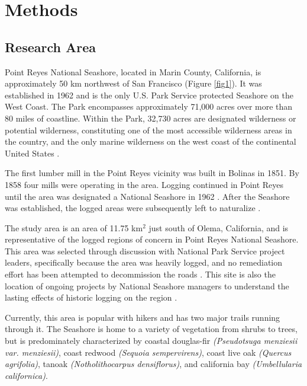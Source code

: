 \documentclass[remotesensing,article,submit,pdftex,moreauthors]{Definitions/mdpi}
\begin{document}
\section{Methods}
\subsection{Research Area}

Point Reyes National Seashore, located in Marin County, California, is approximately 50 km northwest of San Francisco (Figure \ref{fig1}). It was established in 1962 and is the only U.S. Park Service protected Seashore on the West Coast. The Park encompasses approximately 71,000 acres over more than 80 miles of coastline. Within the Park, 32,730 acres are designated wilderness or potential wilderness, constituting one of the most accessible wilderness areas in the country, and the only marine wilderness on the west coast of the continental United States \cite{council}.  

The first lumber mill in the Point Reyes vicinity was built in Bolinas in 1851. By 1858 four mills were operating in the area. Logging continued in Point Reyes until the area was designated a National Seashore in 1962 \cite{livingston}. After the Seashore was established, the logged areas were subsequently left to naturalize \cite{becker}. 

The study area is an area of 11.75 km$^2$ just south of Olema, California, and is representative of the logged regions of concern in Point Reyes National Seashore. This area was selected through discussion with National Park Service project leaders, specifically because the area was heavily logged, and no remediation effort has been attempted to decommission the roads \cite{becker}. This site is also the location of ongoing projects by National Seashore managers to understand the lasting effects of historic logging on the region \cite{becker}.

Currently, this area is popular with hikers and has two major trails running through it. The Seashore is home to a variety of vegetation from shrubs to trees, but is predominately characterized by coastal douglas-fir {\it (Pseudotsuga menziesii var. menziesii)}, coast redwood {\it (Sequoia sempervirens)}, coast live oak {\it (Quercus agrifolia)}, tanoak {\it (Notholithocarpus densiflorus)}, and california bay {\it (Umbellularia californica)}.
\end{document}
